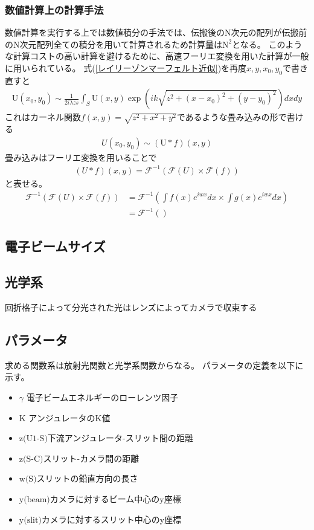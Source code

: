 \documentclass[a4paper,11pt,uplatex]{jsarticle}
\begin{document}
\subsubsection{数値計算上の計算手法}
数値計算を実行する上では数値積分の手法では、伝搬後のN次元の配列が伝搬前のN次元配列全ての積分を用いて計算されるため計算量は$\text{N}^2$となる。
このような計算コストの高い計算を避けるために、高速フーリエ変換を用いた計算が一般に用いられている。
式(\ref{レイリーゾンマーフェルト近似})を再度$x,y,x_0,y_0$で書き直すと
\begin{eqnarray}
  \text{U}(x_0,y_0) \sim \frac{1}{2i\lambda zs}\int_S \text{U}(x,y) \exp( ik \sqrt{z^2 + (x-x_0)^2 + (y-y_0)^2}) dxdy
\end{eqnarray}
これはカーネル関数$f(x,y) = \sqrt{z^2 +x^2 + y^2}$であるような畳み込みの形で書ける
\begin{eqnarray}
  U(x_0,y_0) \sim (\text{U} * f)(x,y)
\end{eqnarray}
畳み込みはフーリエ変換を用いることで
\begin{eqnarray}
  (U*f)(x,y) = \mathcal{F}^{-1}(\mathcal{F}(U) \times \mathcal{F}(f))
\end{eqnarray}
と表せる。
\begin{eqnarray}
  \mathcal{F}^{-1}(\mathcal{F}(U) \times \mathcal{F}(f)) &= \mathcal{F}^{-1} \left( \int f(x)e^{iwx}dx \times \int g(x)e^{iwx}dx \right) \\
  &= \mathcal{F}^{-1}\left( \right)
\end{eqnarray}

\subsection{電子ビームサイズ}

\subsection{光学系}
回折格子によって分光された光はレンズによってカメラで収束する

\subsection{パラメータ}
求める関数系は放射光関数と光学系関数からなる。
パラメータの定義を以下に示す。
\begin{itemize}
\item$\gamma$ 電子ビームエネルギーのローレンツ因子
\item$\text{K}$ アンジュレータのK値
\item$\text{z(U1-S)}$下流アンジュレータ-スリット間の距離
\item$\text{z(S-C)}$スリット-カメラ間の距離
\item$\text{w(S)}$スリットの鉛直方向の長さ
\item$\text{y(beam)}$カメラに対するビーム中心のy座標
\item$\text{y(slit)}$カメラに対するスリット中心のy座標
\end{itemize}
\end{document}
